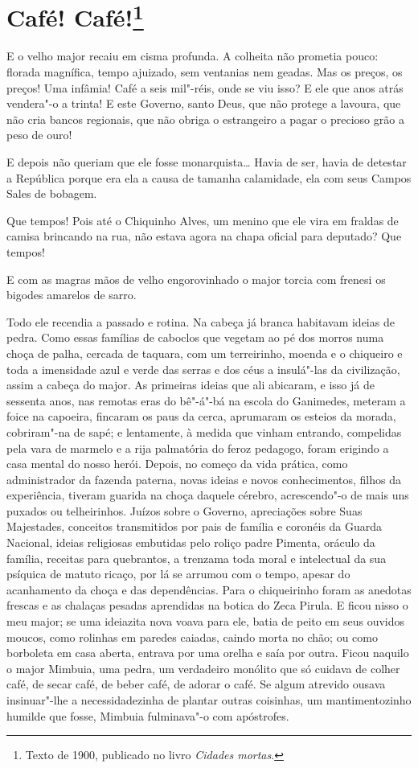 \chapter{Café! Café!\footnote[*]{Texto de 1900, publicado no livro \emph{Cidades mortas}.}}

E o velho major recaiu em cisma profunda. A colheita não prometia pouco:
florada magnífica, tempo ajuizado, sem ventanias nem geadas. Mas os
preços, os preços! Uma infâmia! Café a seis mil"-réis, onde se viu isso?
E ele que anos atrás vendera"-o a trinta! E este Governo, santo Deus, que
não protege a lavoura, que não cria bancos regionais, que não obriga o
estrangeiro a pagar o precioso grão a peso de ouro!

E depois não queriam que ele fosse monarquista\ldots{} Havia de ser, havia de
detestar a República porque era ela a causa de tamanha calamidade, ela
com seus Campos Sales de bobagem.

Que tempos! Pois até o Chiquinho Alves, um menino que ele vira em
fraldas de camisa brincando na rua, não estava agora na chapa oficial
para deputado? Que tempos!

E com as magras mãos de velho engorovinhado o major torcia com frenesi
os bigodes amarelos de sarro.

Todo ele recendia a passado e rotina. Na cabeça já branca habitavam
ideias de pedra. Como essas famílias de caboclos que vegetam ao pé dos
morros numa choça de palha, cercada de taquara, com um terreirinho,
moenda e o chiqueiro e toda a imensidade azul e verde das serras e dos
céus a insulá"-las da civilização, assim a cabeça do major. As primeiras
ideias que ali abicaram, e isso já de sessenta anos, nas remotas eras do
bê"-á"-bá na escola do Ganimedes, meteram a foice na capoeira, fincaram os
paus da cerca, aprumaram os esteios da morada, cobriram"-na de sapé; e
lentamente, à medida que vinham entrando, compelidas pela vara de
marmelo e a rija palmatória do feroz pedagogo, foram erigindo a casa
mental do nosso herói. Depois, no começo da vida prática, como
administrador da fazenda paterna, novas ideias e novos conhecimentos,
filhos da experiência, tiveram guarida na choça daquele cérebro,
acrescendo"-o de mais
uns puxados ou telheirinhos. Juízos sobre o Governo, apreciações sobre
Suas Majestades, conceitos transmitidos por pais de família e coronéis
da Guarda Nacional, ideias religiosas embutidas pelo roliço padre
Pimenta, oráculo da família, receitas para quebrantos, a trenzama toda
moral e intelectual da sua psíquica de matuto ricaço, por lá se arrumou
com o tempo, apesar do acanhamento da choça e das dependências. Para o
chiqueirinho foram as anedotas frescas e as chalaças pesadas aprendidas
na botica do Zeca Pirula. E ficou nisso o meu major; se uma ideiazita
nova voava para ele, batia de peito em seus ouvidos moucos, como
rolinhas em paredes caiadas, caindo morta no chão; ou como borboleta em
casa aberta, entrava por uma orelha e saía por outra. Ficou naquilo o
major Mimbuia, uma pedra, um verdadeiro monólito que só cuidava de
colher café, de secar café, de beber café, de adorar o café. Se algum
atrevido ousava insinuar"-lhe a necessidadezinha de plantar outras
coisinhas, um mantimentozinho humilde que fosse, Mimbuia fulminava"-o com
apóstrofes.

